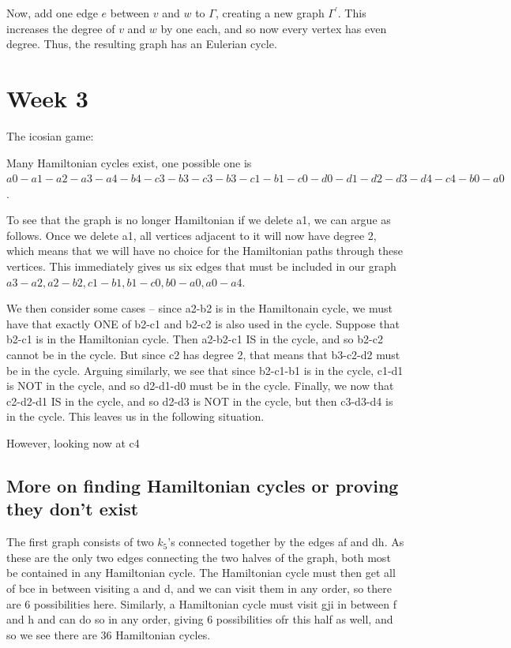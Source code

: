 \documentclass{amsart}
\begin{document}
Now, add one edge $e$ between $v$ and $w$ to $\Gamma$, creating a new graph $\Gamma^\prime$.  This increases the degree of $v$ and $w$ by one each, and so now every vertex has even degree.  Thus, the resulting graph has an Eulerian cycle.  


  
\section{Week 3}

The icosian game:

Many Hamiltonian cycles exist, one possible one is $a0-a1-a2-a3-a4-b4-c3-b3-c3-b3-c1-b1-c0-d0-d1-d2-d3-d4-c4-b0-a0$.

To see that the graph is no longer Hamiltonian if we delete a1, we can argue as follows.  Once we delete a1, all vertices adjacent to it will now have degree 2, which means that we will have no choice for the Hamiltonian paths through these vertices.  This immediately gives us six edges that must be included in our graph $a3-a2, a2-b2, c1-b1, b1-c0, b0-a0, a0-a4$.

We then consider some cases -- since a2-b2 is in the Hamiltonain cycle, we must have that exactly ONE of b2-c1 and b2-c2 is also used in the cycle.  Suppose that b2-c1 is in the Hamiltonian cycle.  Then a2-b2-c1 IS in the cycle, and so b2-c2 cannot be in the cycle.  But since c2 has degree 2, that means that b3-c2-d2 must be in the cycle.  Arguing similarly, we see that since b2-c1-b1 is in the cycle, c1-d1 is NOT in the cycle, and so d2-d1-d0 must be in the cycle.  Finally, we now that c2-d2-d1 IS in the cycle, and so d2-d3 is NOT in the cycle, but then c3-d3-d4 is in the cycle.  This leaves us in the following situation.

However, looking now at c4


\subsection{More on finding Hamiltonian cycles or proving they don't exist}
The first graph consists of two $k_5$'s connected together by the edges af and dh.  As these are the only two edges connecting the two halves of the graph, both most be contained in any Hamiltonian cycle.  The Hamiltonian cycle must then get all of bce in between visiting a and d, and we can visit them in any order, so there are 6 possibilities here.  Similarly, a Hamiltonian cycle must visit gji in between f and h and can do so in any order, giving 6 possibilities ofr this half as well, and so we see there are 36 Hamiltonian cycles.
\end{document}
